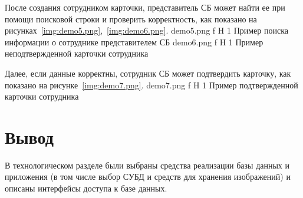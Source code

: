 После создания сотрудником карточки, представитель СБ может найти ее при помощи поисковой строки и проверить корректность, как показано на рисунках~\ref{img:demo5.png},~\ref{img:demo6.png}.
	{demo5.png}
	{f}
	{H}
	{1\textwidth}
	{Пример поиска информации о сотруднике представителем СБ}
	{demo6.png}
	{f}
	{H}
	{1\textwidth}
	{Пример неподтвержденной карточки сотрудника}


Далее, если данные корректны, сотрудник СБ может подтвердить карточку, как показано на рисунке~\ref{img:demo7.png}.
	{demo7.png}
	{f}
	{H}
	{1\textwidth}
	{Пример подтвержденной карточки сотрудника}

\section*{Вывод}

В технологическом разделе были выбраны средства реализации базы данных и приложения (в том числе выбор СУБД и средств для хранения изображений) и описаны интерфейсы доступа к базе данных.